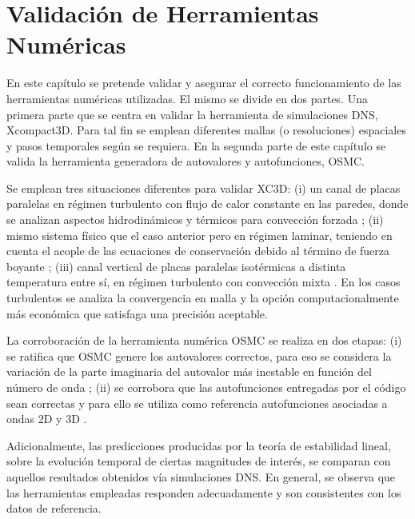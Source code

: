 \chapter{Validación de Herramientas Numéricas} \label{cap:validacion}


En este capítulo se pretende validar y asegurar el correcto funcionamiento de las \linebreak herramientas numéricas utilizadas. El mismo se divide en dos partes. Una primera parte que se centra en validar la herramienta de simulaciones DNS, Xcompact3D. Para tal fin se emplean diferentes mallas (o resoluciones) espaciales y pasos temporales según se requiera. En la segunda parte de este capítulo se valida la herramienta generadora de autovalores y autofunciones, OSMC. 

Se emplean tres situaciones diferentes para validar XC3D: (i) un canal de placas paralelas en régimen turbulento con flujo de calor constante en las paredes, donde se analizan aspectos hidrodinámicos y térmicos para convección forzada \cite{moser1999, kawamura2000dns}; (ii) mismo sistema físico que el caso anterior pero en régimen laminar, teniendo en cuenta el acople de las ecuaciones de conservación debido al término de fuerza boyante \linebreak \cite{chen1996linear}; (iii) canal vertical de placas paralelas isotérmicas a distinta temperatura entre sí, en régimen  turbulento con convección mixta \cite{guo2022direct}. En los casos turbulentos se analiza la convergencia en malla y la opción computacionalmente más económica que satisfaga una precisión aceptable.

La corroboración de la herramienta numérica OSMC se realiza en dos etapas: (i) se ratifica que OSMC genere los autovalores correctos, para eso se considera la variación de la parte \linebreak imaginaria del autovalor más inestable en función del número de onda \cite{chen1996linear}; (ii) se corrobora que las autofunciones entregadas por el código sean correctas y para ello se utiliza como referencia autofunciones asociadas a ondas 2D y 3D \cite{chen2003direct}.

Adicionalmente, las predicciones producidas por la teoría de estabilidad lineal, sobre la evolución temporal de ciertas magnitudes de interés, se comparan con aquellos resultados obtenidos vía simulaciones DNS. En general, se observa que las herramientas empleadas \linebreak responden adecuadamente y son consistentes con los datos de referencia.



